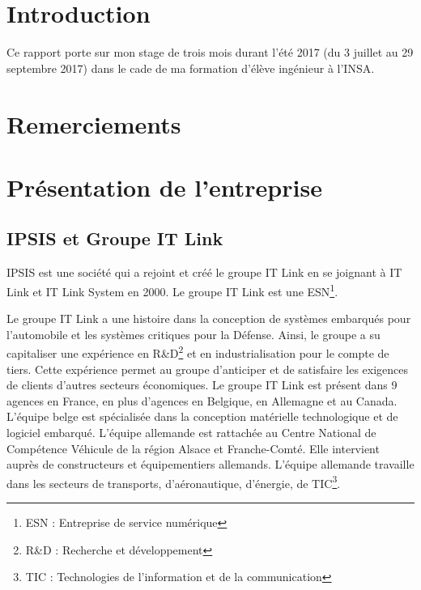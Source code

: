 \documentclass{article}
\begin{document}

\newpage

\section*{Introduction}

Ce rapport porte sur mon stage de trois mois durant l'été 2017 (du 3
juillet au 29 septembre 2017) dans le cade de ma formation d'élève
ingénieur à l'INSA.

\section*{Remerciements}

\newpage

\tableofcontents

\newpage

\section{Présentation de l'entreprise}

\subsection{IPSIS et Groupe IT Link}

IPSIS est une société qui a rejoint et créé le groupe IT Link en se
joignant à IT Link et IT Link System en 2000. Le groupe IT Link est une
ESN\footnote{ESN : Entreprise de service numérique}.

Le groupe IT Link a une histoire dans la conception de systèmes
embarqués pour l'automobile et les systèmes critiques pour la Défense.
Ainsi, le groupe a su capitaliser une expérience en
R\&D\footnote{R\&D : Recherche et développement} et en industrialisation pour le
compte de tiers. Cette expérience permet au groupe d'anticiper et de
satisfaire les exigences de clients d'autres secteurs économiques. Le
groupe IT Link est présent dans 9 agences en France, en plus d'agences
en Belgique, en Allemagne et au Canada. L'équipe belge est spécialisée
dans la conception matérielle technologique et de logiciel embarqué.
L'équipe allemande est rattachée au Centre National de Compétence
Véhicule de la région Alsace et Franche-Comté. Elle intervient auprès de
constructeurs et équipementiers allemands. L'équipe allemande travaille
dans les secteurs de transports, d'aéronautique, d'énergie, de
TIC\footnote{TIC : Technologies de l'information et de la communication}.
\end{document}
